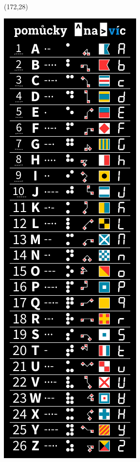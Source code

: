 \documentclass{extarticle}
\begin{document}
\begin{textblock}{42}(172,28)
\vfill
{\centerline{\includegraphics[scale=1,]{tools-front.pdf}}} 
\vfill
\end{textblock}
\end{document}
